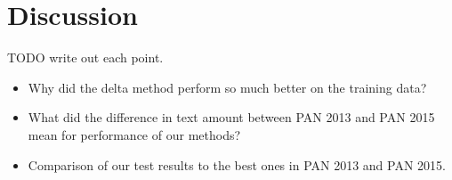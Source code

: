 \section{Discussion}
TODO write out each point.

\begin{itemize}
    \item Why did the delta method perform so much better on the training data?
    \item What did the difference in text amount between PAN 2013 and PAN 2015
        mean for performance of our methods?
    \item Comparison of our test results to the best ones in PAN 2013 and PAN
        2015.
\end{itemize}
